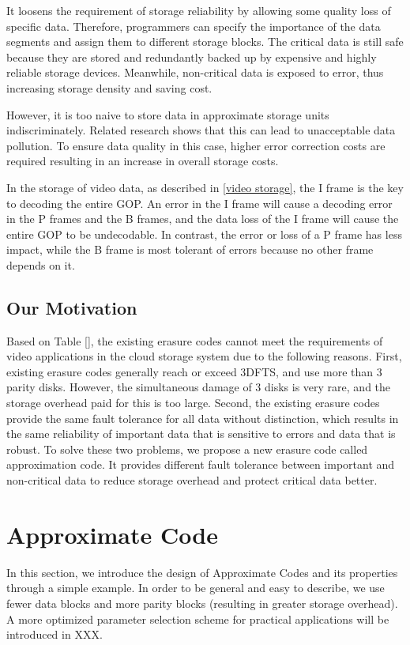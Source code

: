 \documentclass[sigconf]{acmart}
\begin{document}
It loosens the requirement of storage reliability by allowing some quality loss of specific data. Therefore, programmers can specify the importance of the data segments and assign them to different storage blocks. The critical data is still safe because they are stored and redundantly backed up by expensive and highly reliable storage devices. Meanwhile, non-critical data is exposed to error, thus increasing storage density and saving cost.

However, it is too naive to store data in approximate storage units indiscriminately. Related research \cite{guo2016high} shows that this can lead to unacceptable data pollution. To ensure data quality in this case, higher error correction costs are required resulting in an increase in overall storage costs.

In the storage of video data, as described in \ref{video storage}, the I frame is the key to decoding the entire GOP. An error in the I frame will cause a decoding error in the P frames and the B frames, and the data loss of the I frame will cause the entire GOP to be undecodable. In contrast, the error or loss of a P frame has less impact, while the B frame is most tolerant of errors because no other frame depends on it.

\subsection{Our Motivation}
Based on Table [], the existing erasure codes cannot meet the requirements of video applications in the cloud storage system due to the following reasons. First, existing erasure codes generally reach or exceed 3DFTS, and use more than 3 parity disks. However, the simultaneous damage of 3 disks is very rare, and the storage overhead paid for this is too large. Second, the existing erasure codes provide the same fault tolerance for all data without distinction, which results in the same reliability of important data that is sensitive to errors and data that is robust. To solve these two problems, we propose a new erasure code called approximation code. It provides different fault tolerance between important and non-critical data to reduce storage overhead and protect critical data better.

\section{Approximate Code}
In this section, we introduce the design of Approximate Codes and its properties through a simple example. In order to be general and easy to describe, we use fewer data blocks and more parity blocks (resulting in greater storage overhead). A more optimized parameter selection scheme for practical applications will be introduced in XXX.
\end{document}
